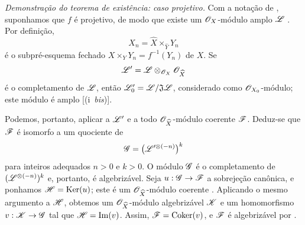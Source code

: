 \begin{env}[5.2.5]
\label{III.5.2.5}
\emph{Demonstração do teorema de existência: caso projetivo.}
Com a notação de , suponhamos que $f$ é
projetivo, de modo que existe um $\mathscr{O}_X$-módulo amplo $\mathscr{L}$
. Por definição,
\[
  X_n=\widehat{X}\times_{\widehat{Y}}Y_n
\]
é o subpré-esquema fechado
$X\times_Y Y_n=f^{-1}(Y_n)$ de $X$. Se
\[
  \mathscr{L}'=\mathscr{L}\otimes_{\mathscr{O}_X}\mathscr{O}_{\widehat{X}}
\]
é o completamento de $\mathscr{L}$, então
$\mathscr{L}'_0=\mathscr{L}/\mathfrak{J}\mathscr{L}$, considerado como
$\mathscr{O}_{X_0}$-módulo; este módulo é amplo
[(i~\emph{bis})].

Podemos, portanto, aplicar  a $\mathscr{L}'$ e a todo
$\mathscr{O}_{\widehat{X}}$-módulo coerente $\mathscr{F}$. Deduz-se que
$\mathscr{F}$ é isomorfo a um quociente de
\[
  \mathscr{G}=
  \bigl(\mathscr{L}'^{\otimes(-n)}\bigr)^k
\]
para inteiros adequados $n>0$ e $k>0$. O módulo $\mathscr{G}$ é o
completamento de $(\mathscr{L}^{\otimes(-n)})^k$
 e, portanto, é algebrizável. Seja
$u:\sh{G}\to\sh{F}$ a sobrejeção canônica, e ponhamos
$\mathscr{H}=\operatorname{Ker}(u)$; este é um
$\mathscr{O}_{\widehat{X}}$-módulo coerente . Aplicando o mesmo
argumento a $\mathscr{H}$, obtemos um
$\mathscr{O}_{\widehat{X}}$-módulo algebrizável $\mathscr{K}$ e um homomorfismo
$v:\sh{K}\to\sh{G}$ tal que $\mathscr{H}=\operatorname{Im}(v)$. Assim,
$\mathscr{F}=\operatorname{Coker}(v)$, e $\mathscr{F}$ é algebrizável por
.
\end{env}


